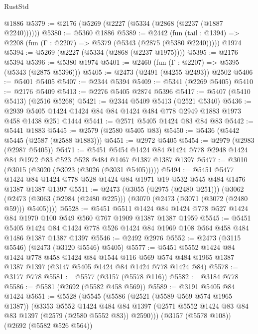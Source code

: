 \begin{lexlean}{RustStd}
\begin{coremodule}
    @1886
@5379 := @2176 (@5269 (@2227 (@5334 (@2868 (@2237 (@1887 @2240))))))
@5380 := @5360 @1886
@5389 := @2442
    (fun (tail : @1394) => @2208 (fun (Γ : @2207) => @5379 (@5343 (@2875 (@5380 @2240)))))
    @1974
@5394 := @5269 (@2227 (@5334 (@2868 (@2237 @1975))))
@5395 := @2176 @5394
@5396 := @5380 @1974
@5401 := @2460 (fun (Γ : @2207) => @5395 (@5343 (@2875 @5396)))
@5405 := @2473 (@2491 (@4255 @2493)) @2502
@5406 := @5401 @5405
@5407 := @2344 @5394
@5409 := @5341 (@2269 @5405)
@5410 := @2176 @5409
@5413 := @2276 @5405 @2874 @5396
@5417 := @5407 (@5410 @5413) (@2516 @5268)
@5421 := @2344 @5409 @5413 (@2521 @5340)
@5436 := @2939 @5405 @1424 @1424 @84 @84 @1424 @484 @778 @2949 @1883 @1973 @458 @1438 @251 @1444
@5441 := @2571 @5405 @1424 @83 @84 @83
@5442 := @5441 @1883
@5445 := @2579 (@2580 @5405 @83)
@5450 := @5436 (@5442 @5445 (@2587 (@2588 @1883)))
@5451 := @2972 @5405
@5454 := @2979 (@2983 (@2987 @5405))
@5471 := @5451
    @5454
    @1424
    @84
    @1424
    @778
    @2948
    @1424
    @84
    @1972
    @83
    @523
    @528
    @484
    @1467
    @1387
    @1387
    @1397
@5477 := @3010 (@3015 (@3020 (@3023 (@3026 (@3031 @5405)))))
@5494 := @5451
    @5477
    @1424
    @84
    @1424
    @778
    @528
    @1424
    @84
    @1971
    @19
    @532
    @545
    @484
    @1476
    @1387
    @1387
    @1397
@5511 := @2473
    (@3055 (@2975 (@2480 @251)))
    (@3062 (@2473 (@3063 (@2984 (@2480 @225))) (@3070 (@2473 (@3071 (@3072 (@2480 @59))) @5405))))
@5528 := @5451
    @5511
    @1424
    @84
    @1424
    @778
    @527
    @1424
    @84
    @1970
    @100
    @549
    @560
    @767
    @1909
    @1387
    @1387
    @1959
@5545 := @5451
    @5405
    @1424
    @84
    @1424
    @778
    @526
    @1424
    @84
    @1969
    @108
    @564
    @458
    @484
    @1486
    @1387
    @1387
    @1397
@5546 := @2492 @2976
@5552 := @2473 (@3115 @5546) (@2473 (@3120 @5546) @5405)
@5577 := @5451
    @5552
    @1424
    @84
    @1424
    @778
    @458
    @1424
    @84
    @1544
    @116
    @569
    @574
    @484
    @1965
    @1387
    @1387
    @1397
    (@3147 @5405 @1424 @84 @1424 @778 @1424 @84)
@5578 := @3177 @778
@5581 := @5577 (@3157 (@5578 @116))
@5582 := @3184 @778
@5586 := @5581 (@2692 (@5582 @458 @569))
@5589 := @3191 @5405 @84 @1424
@5651 := @5528
    (@5545
      (@5586
        (@2521 (@5589 @569 @574 @1965 @1387))
        (@3353
          @5552
          @1424
          @484
          @84
          @1397
          (@2571 @5552 @1424 @83 @84 @83 @1397 (@2579 (@2580 @5552 @83)) @2590)))
      (@3157 (@5578 @108))
      (@2692 (@5582 @526 @564))

\end{coremodule}
\end{lexlean}
